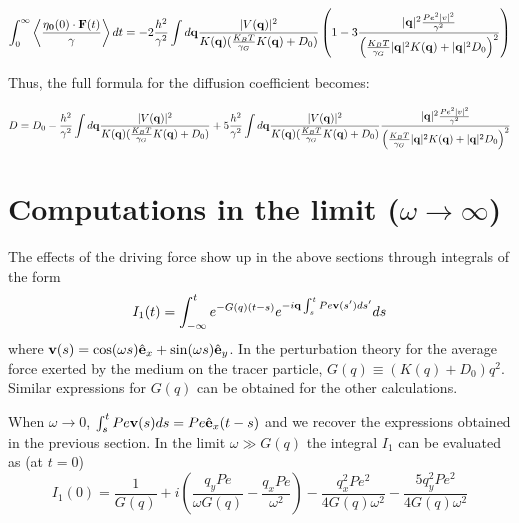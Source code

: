 \documentclass[amsmath,preprintnumbers,10pt,article,notitlepage]{revtex4-1}
\begin{document}
\begin{equation}
\int_0^\infty  \left \langle \dfrac{ {\bf \eta_0}(0) \cdot {\bf F}(t)}{\gamma} \right \rangle dt = - 2\dfrac{h^2}{\gamma^2}  \int d{\bf q} \dfrac{ |V({\bf q})|^2 } { K({\bf q}) ( \frac{K_BT}{\gamma_G}  K({\bf q}) +  D_0 )} \left( 1- 3 \dfrac{|{\bf q}|^2 \frac{Pe^2 |v|^2}{\gamma^2}}{\left(  \frac{K_BT}{\gamma_G} |{\bf q}|^2 K({\bf q}) +  |{\bf q}|^2 D_0 \right)^2} \right)
\end{equation}


Thus, the full formula for the diffusion coefficient becomes:

\begin{equation}
D = D_0 - \dfrac{h^2}{\gamma^2}  \int d{\bf q} \dfrac{ |V({\bf q})|^2 } { K({\bf q}) ( \frac{K_BT}{\gamma_G}  K({\bf q}) +  D_0 )} + 5 \dfrac{h^2}{\gamma^2}  \int d{\bf q} \dfrac{ |V({\bf q})|^2 } { K({\bf q}) ( \frac{K_BT}{\gamma_G}  K({\bf q}) +  D_0 )}  \dfrac{|{\bf q}|^2 \frac{Pe^2 |v|^2}{\gamma^2}}{\left(  \frac{K_BT}{\gamma_G} |{\bf q}|^2 K({\bf q}) +  |{\bf q}|^2 D_0 \right)^2} 
\end{equation}


\section{Computations in the limit ($\omega \rightarrow \infty$) }
The effects of the driving force show up in the above sections through integrals of the form 
\begin{equation}
I_1(t)= \int_{-\infty}^{t} e^{-G(q) (t-s)} e^{- i {\bf q} \int_s^t {Pe {\bf v}(s') ds'}} ds 
\label{eq:centralIntegral}
\end{equation}
where ${\bf v}(s) =\cos(\omega s) \hat {\bf e}_x + \sin(\omega s) \hat{\bf e}_y$. In the perturbation theory for the average force exerted by the medium on the tracer particle, $G(q) \equiv (K(q) + D_0)q^2 $. Similar expressions for $G(q)$ can be obtained for the other calculations. 

When $\omega\rightarrow 0$, $\int_s^t Pe{\bf v}(s) ds = Pe \hat {\bf e}_x (t-s)$ and we recover the expressions obtained in the previous section. 
In the limit $\omega\gg G(q)$ the integral $I_1$ can be evaluated as (at $t=0$)
\begin{equation}
I_1(0)= \frac{1}{G(q)} + i\left( \frac{q_y Pe}{\omega G(q)} - \frac{q_x Pe}{\omega^2}\right)- \frac{ q_x^2 Pe^2 }{ 4 G(q) \omega^2} -\frac{5 q_y^2 Pe^2}{4 G(q)\omega^2}
\label{eq:centralIntegral2}
\end{equation}
\end{document}

